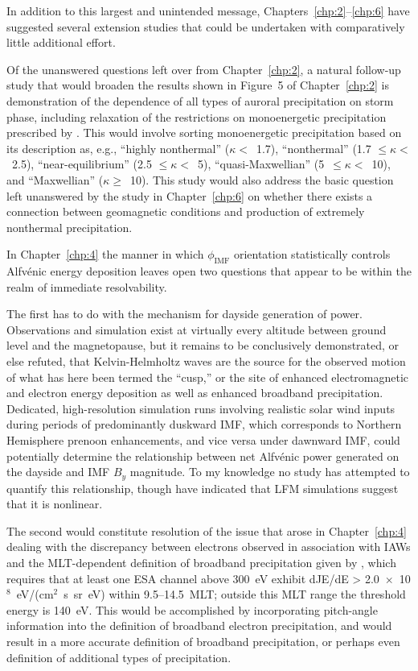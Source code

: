   In addition to this largest and unintended message,
  Chapters~\ref{chp:2}--\ref{chp:6} have suggested several extension studies
  that could be undertaken with comparatively little additional effort.

  Of the unanswered questions left over from Chapter~\ref{chp:2}, a natural
  follow-up study that would broaden the results shown in Figure~5 of
  Chapter~\ref{chp:2} is demonstration of the dependence of all types of auroral
  precipitation on storm phase, including relaxation of the restrictions on
  monoenergetic precipitation prescribed by \citet{McIntosh2014}. This would
  involve sorting monoenergetic precipitation based on its description as, e.g.,
  ``highly nonthermal'' ($\kappa <$~1.7), ``nonthermal'' (1.7 $\leq \kappa
  <$~2.5), ``near-equilibrium'' (2.5 $\leq \kappa <$~5), ``quasi-Maxwellian''
  (5~$\leq \kappa <$~10), and ``Maxwellian'' ($\kappa \geq$~10). This study
  would also address the basic question left unanswered by the study in
  Chapter~\ref{chp:6} on whether there exists a connection between geomagnetic
  conditions and production of extremely nonthermal precipitation.

  In Chapter~\ref{chp:4} the manner in which $\phi_{\textrm{IMF}}$ orientation
  statistically controls Alfv\'{e}nic energy deposition leaves open two
  questions that appear to be within the realm of immediate resolvability.

  The first has to do with the mechanism for dayside generation of \Alfic
  power. Observations and simulation exist at virtually every altitude between
  ground level and the magnetopause, but it remains to be conclusively
  demonstrated, or else refuted, that Kelvin-Helmholtz waves are the source for
  the observed motion of what has here been termed the ``\Alfic cusp,'' or the
  site of enhanced \Alfic electromagnetic and electron energy deposition as well
  as enhanced broadband precipitation. Dedicated, high-resolution simulation
  runs involving realistic solar wind inputs during periods of predominantly
  duskward IMF, which corresponds to Northern Hemisphere prenoon \Alfic
  enhancements, and vice versa under dawnward IMF, could potentially determine
  the relationship between net Alfv\'{e}nic power generated on the dayside and
  IMF $B_y$ magnitude. To my knowledge no study has attempted to quantify this
  relationship, though \citet{Zhang2014} have indicated that LFM simulations
  suggest that it is nonlinear.

  The second would constitute resolution of the issue that arose in
  Chapter~\ref{chp:4} dealing with the discrepancy between electrons observed in
  association with IAWs and the MLT-dependent definition of broadband
  precipitation given by \citet{Newell2009}, which requires that at least one
  ESA channel above 300~eV exhibit dJE/dE >
  2.0~$\times$~10$^8$~eV/(cm$^2$~s~sr~eV) within 9.5--14.5~MLT; outside this MLT
  range the threshold energy is 140~eV. This would be accomplished by
  incorporating pitch-angle information into the definition of broadband
  electron precipitation, and would result in a more accurate definition of
  broadband precipitation, or perhaps even definition of additional types of
  precipitation.

